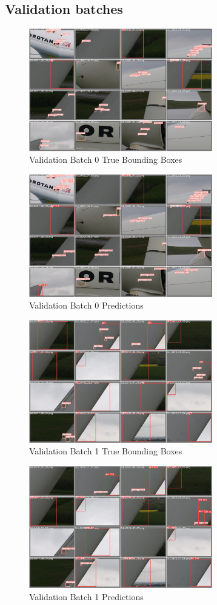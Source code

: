 \documentclass[conference]{IEEEtran}
\begin{document}
\subsection{Validation batches}
\begin{figure}[H]
    \centering
    \includegraphics[width=8cm]{Images/YOLOv5L/val_batch0_labels.jpg}
    \caption{Validation Batch 0 True Bounding Boxes}
\end{figure}
\begin{figure}[H]
    \centering
    \includegraphics[width=8cm]{Images/YOLOv5L/val_batch0_pred.jpg}
    \caption{Validation Batch 0 Predictions}
\end{figure}
\begin{figure}[H]
    \centering
    \includegraphics[width=8cm]{Images/YOLOv5L/val_batch1_labels.jpg}
    \caption{Validation Batch 1 True Bounding Boxes}
\end{figure}
\begin{figure}[H]
    \centering
    \includegraphics[width=8cm]{Images/YOLOv5L/val_batch1_pred.jpg}
    \caption{Validation Batch 1 Predictions}
\end{figure}
\end{document}
